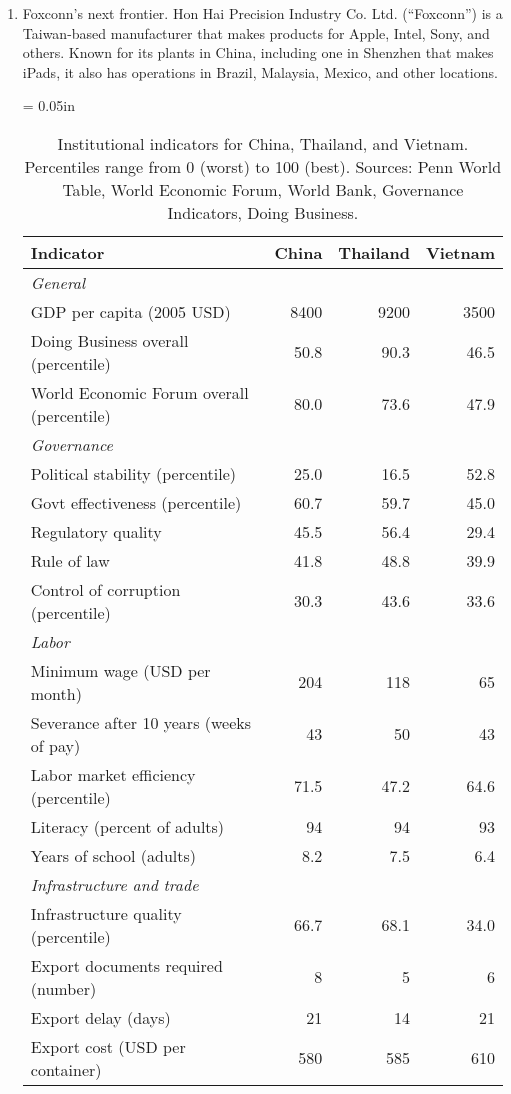 \begin{enumerate}
\item Foxconn's next frontier.
Hon Hai Precision Industry Co. Ltd. (``Foxconn'') is a Taiwan-based manufacturer that makes
products for Apple, Intel, Sony, and others.
Known for its plants in China, including one in Shenzhen that makes iPads,
it also has operations in Brazil, Malaysia, Mexico, and other locations.


\begin{table}[h]
\centering
\tabcolsep = 0.05in
\begin{tabular}{lrrr}
\toprule
Indicator & China & Thailand & Vietnam \\
\midrule
\multicolumn{2}{l}{\it General} \\
GDP per capita  (2005 USD) &  8400 & 9200 & 3500  \\
Doing Business overall (percentile) & 50.8  &90.3 & 46.5 \\
World Economic Forum overall (percentile) & 80.0 & 73.6 & 47.9\\
\midrule
\multicolumn{2}{l}{\it Governance} \\
Political stability (percentile)  &  25.0 & 16.5 & 52.8 \\
Govt effectiveness (percentile)   &  60.7 & 59.7 & 45.0 \\
Regulatory quality                & 45.5  & 56.4 & 29.4\\
Rule of law                       & 41.8 & 48.8 & 39.9 \\
Control of corruption (percentile) & 30.3 & 43.6 & 33.6  \\
\midrule
\multicolumn{2}{l}{\it Labor} \\
Minimum wage (USD per month) &  204 & 118 & 65 \\
Severance after 10 years (weeks of pay) & 43 & 50 & 43 \\
Labor market efficiency (percentile) & 71.5 & 47.2 & 64.6 \\
Literacy (percent of adults)        & 94 & 94 & 93 \\
Years of school (adults)        & 8.2 & 7.5 & 6.4 \\
\midrule
\multicolumn{2}{l}{\it Infrastructure and trade} \\
Infrastructure quality (percentile)  & 66.7 & 68.1 & 34.0 \\
Export documents required (number) & 8 & 5 & 6\\
Export delay (days) &  21 & 14 & 21  \\
Export cost (USD per container) &  580 & 585 & 610 \\
\bottomrule
\end{tabular}
\caption{Institutional indicators for China, Thailand, and Vietnam.
Percentiles range from 0 (worst) to 100 (best).
Sources:  Penn World Table, World Economic Forum, World Bank, Governance Indicators, Doing Business.}
\label{tab:ctv}
\end{table}


\end{enumerate}
